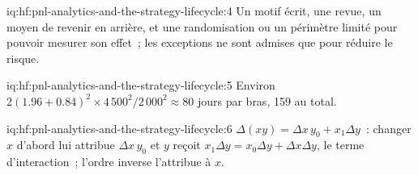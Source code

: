 \begin{solution}{iq:hf:pnl-analytics-and-the-strategy-lifecycle:4}
Un motif écrit, une revue, un moyen de revenir en arrière, et une randomisation ou un périmètre limité pour pouvoir mesurer son effet~; les exceptions ne sont admises que pour réduire le risque.
\end{solution}

\begin{solution}{iq:hf:pnl-analytics-and-the-strategy-lifecycle:5}
Environ $2(1.96+0.84)^2\times4\,500^2/2\,000^2\approx80$ jours par bras, 159 au total.
\end{solution}

\begin{solution}{iq:hf:pnl-analytics-and-the-strategy-lifecycle:6}
$\Delta(xy)=\Delta x\,y_0+x_1\Delta y$~: changer $x$ d'abord lui attribue $\Delta x\,y_0$ et $y$ reçoit $x_1\Delta y=x_0\Delta y+\Delta x\Delta y$, le
terme d'interaction~; l'ordre inverse l'attribue à $x$.
\end{solution}
